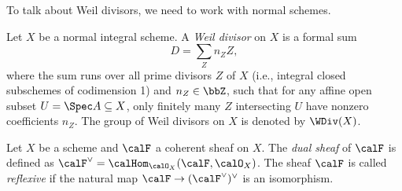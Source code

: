     To talk about Weil divisors, we need to work with normal schemes.

    \begin{definition}\label{def:Weil_divisor}
        Let \(X\) be a normal integral scheme.
        A \emph{Weil divisor} on \(X\) is a formal sum 
        \[ D = \sum_{Z} n_Z Z, \]
        where the sum runs over all prime divisors \(Z\) of \(X\) (i.e., integral closed subschemes of codimension 1) and \(n_Z \in \bbZ\), such that for any affine open subset \(U = \Spec A \subseteq X\), only finitely many \(Z\) intersecting \(U\) have nonzero coefficients \(n_Z\).
        The group of Weil divisors on \(X\) is denoted by \(\WDiv(X)\).
    \end{definition}

    \begin{definition}\label{def:reflexive_sheaves}
        Let \(X\) be a scheme and \(\calF\) a coherent sheaf on \(X\).
        The \emph{dual sheaf} of \(\calF\) is defined as \(\calF^\vee = \calHom_{\calO_X}(\calF, \calO_X)\).
        The sheaf \(\calF\) is called \emph{reflexive} if the natural map \(\calF \to (\calF^\vee)^\vee\) is an isomorphism.
    \end{definition}
